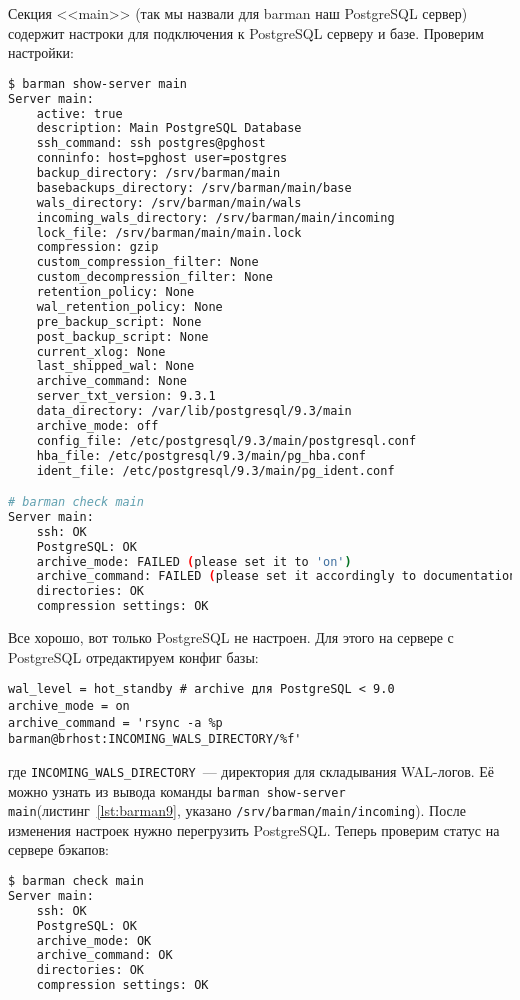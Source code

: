 Секция <<main>> (так мы назвали для barman наш PostgreSQL сервер) содержит настроки для подключения к PostgreSQL серверу и базе. Проверим настройки:

\begin{lstlisting}[language=Bash,label=lst:barman9,caption=Проверка barman настроек]
$ barman show-server main
Server main:
	active: true
	description: Main PostgreSQL Database
	ssh_command: ssh postgres@pghost
	conninfo: host=pghost user=postgres
	backup_directory: /srv/barman/main
	basebackups_directory: /srv/barman/main/base
	wals_directory: /srv/barman/main/wals
	incoming_wals_directory: /srv/barman/main/incoming
	lock_file: /srv/barman/main/main.lock
	compression: gzip
	custom_compression_filter: None
	custom_decompression_filter: None
	retention_policy: None
	wal_retention_policy: None
	pre_backup_script: None
	post_backup_script: None
	current_xlog: None
	last_shipped_wal: None
	archive_command: None
	server_txt_version: 9.3.1
	data_directory: /var/lib/postgresql/9.3/main
	archive_mode: off
	config_file: /etc/postgresql/9.3/main/postgresql.conf
	hba_file: /etc/postgresql/9.3/main/pg_hba.conf
	ident_file: /etc/postgresql/9.3/main/pg_ident.conf

# barman check main
Server main:
	ssh: OK
	PostgreSQL: OK
	archive_mode: FAILED (please set it to 'on')
	archive_command: FAILED (please set it accordingly to documentation)
	directories: OK
	compression settings: OK
\end{lstlisting}

Все хорошо, вот только PostgreSQL не настроен. Для этого на сервере с PostgreSQL отредактируем конфиг базы:

\begin{lstlisting}[label=lst:barman10,caption=Настройка PostgreSQL]
wal_level = hot_standby # archive для PostgreSQL < 9.0
archive_mode = on
archive_command = 'rsync -a %p barman@brhost:INCOMING_WALS_DIRECTORY/%f'
\end{lstlisting}

где \lstinline!INCOMING_WALS_DIRECTORY!~--- директория для складывания WAL-логов. Её можно узнать из вывода команды \lstinline!barman show-server main!(листинг~\ref{lst:barman9}, указано \lstinline!/srv/barman/main/incoming!). После изменения настроек нужно перегрузить PostgreSQL. Теперь проверим статус на сервере бэкапов:

\begin{lstlisting}[language=Bash,label=lst:barman11,caption=Проверка]
$ barman check main
Server main:
	ssh: OK
	PostgreSQL: OK
	archive_mode: OK
	archive_command: OK
	directories: OK
	compression settings: OK
\end{lstlisting}

